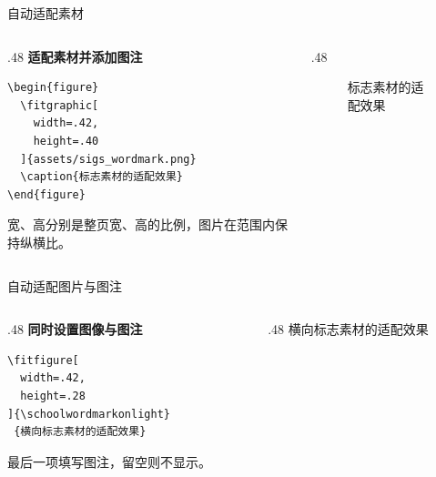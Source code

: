 \begin{frame}[fragile]{自动适配素材}
      \begin{columns}[T,onlytextwidth]
            \begin{column}{.48\textwidth}
                  \textbf{适配素材并添加图注}
                  \begin{verbatim}
\begin{figure}
  \fitgraphic[
    width=.42,
    height=.40
  ]{assets/sigs_wordmark.png}
  \caption{标志素材的适配效果}
\end{figure}
                  \end{verbatim}
                  宽、高分别是整页宽、高的比例，图片在范围内保持纵横比。
            \end{column}
            \begin{column}{.48\textwidth}
                  \begin{figure}
                        \caption{标志素材的适配效果}
                  \end{figure}
            \end{column}
      \end{columns}
\end{frame}

\begin{frame}[fragile]{自动适配图片与图注}
      \begin{columns}[T,onlytextwidth]
            \begin{column}{.48\textwidth}
                  \textbf{同时设置图像与图注}
                  \begin{verbatim}
\fitfigure[
  width=.42,
  height=.28
]{\schoolwordmarkonlight}
 {横向标志素材的适配效果}
                  \end{verbatim}
                  最后一项填写图注，留空则不显示。
            \end{column}
            \begin{column}{.48\textwidth}
                  \fitfigure[width=.42,height=.28]{\schoolwordmarkonlight}%
                        {横向标志素材的适配效果}
            \end{column}
      \end{columns}
\end{frame}


